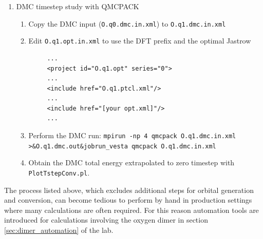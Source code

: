 \begin{enumerate}
  \item{DMC timestep study with QMCPACK}
  \begin{enumerate}
    \item{Copy the DMC input (\texttt{O.q0.dmc.in.xml}) to \texttt{O.q1.dmc.in.xml}}
    \item{Edit \texttt{O.q1.opt.in.xml} to use the DFT prefix and the optimal Jastrow}
    \begin{verbatim}
     ...
     <project id="O.q1.opt" series="0">
     ...
     <include href="O.q1.ptcl.xml"/>
     ...
     <include href="[your opt.xml]"/>
     ...
    \end{verbatim}
    \item{Perform the DMC run: \ifws\verb|mpirun -np 4 qmcpack O.q1.dmc.in.xml >&O.q1.dmc.out&|\else\verb|jobrun_vesta qmcpack O.q1.dmc.in.xml|\fi}
    \item{Obtain the DMC total energy extrapolated to zero timestep with \texttt{PlotTstepConv.pl}.}
  \end{enumerate}
\end{enumerate}
The process listed above, which excludes additional steps for orbital generation and conversion, can become tedious to perform by hand in production settings where many calculations are often required.  For this reason automation tools are introduced for calculations involving the oxygen dimer in section \ref{sec:dimer_automation} of the lab.  

